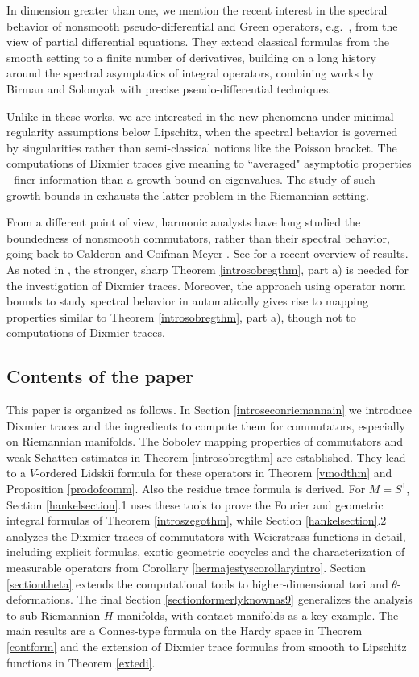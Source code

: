 \documentclass[10pt]{amsart}
\theoremstyle{remark}
\theoremstyle{definition}
\begin{document}
In dimension greater than one, we mention the recent interest in the spectral behavior of nonsmooth pseudo-differential and Green operators, e.g.~\cite{grubb}, from the view of partial differential equations. They extend classical formulas from the smooth setting to a finite number of derivatives, building on a long history around the spectral asymptotics of integral operators, combining works by Birman and Solomyak \cite{birsol, birsolinterpolation} with precise pseudo-differential techniques. 

Unlike in these works, we are interested in the new phenomena under minimal regularity assumptions below Lipschitz, when the spectral behavior is governed by singularities rather than semi-classical notions like the Poisson bracket. The computations of Dixmier traces give meaning to ``averaged" asymptotic properties - finer information than a growth bound on eigenvalues. The study of such growth bounds in \cite{rochbergsemmes} exhausts the latter problem in the Riemannian setting.

From a different point of view, harmonic analysts have long studied the boundedness of nonsmooth commutators, rather than their spectral behavior, going back to Calderon \cite{calderonone} and Coifman-Meyer \cite{ceemtwo}. See \cite[Chapter 3.6]{nlin} for a recent overview of  results. As noted in \cite{gimpgoff}, the stronger, sharp Theorem \ref{introsobregthm}, part a) is needed for the investigation of Dixmier traces. Moreover, the approach using operator norm bounds to study spectral behavior in \cite{gimpgoff} automatically gives rise to mapping properties similar to Theorem \ref{introsobregthm}, part a), though not to computations of Dixmier traces. 

\subsection*{Contents of the paper}

This paper is organized as follows. In Section \ref{introseconriemannain} we introduce Dixmier traces and the ingredients to compute them for commutators, especially on Riemannian manifolds. The Sobolev mapping properties of commutators and weak Schatten estimates in Theorem \ref{introsobregthm} are established. They lead to a $V$-ordered Lidskii formula for these operators in Theorem \ref{vmodthm} and Proposition \ref{prodofcomm}. Also the residue trace formula is derived. For $M=S^1$, Section \ref{hankelsection}.1 uses these tools to prove the Fourier and geometric integral formulas  of Theorem \ref{introszegothm}, while Section \ref{hankelsection}.2 analyzes the Dixmier traces of commutators with Weierstrass functions in detail, including explicit formulas, exotic geometric cocycles and the characterization of measurable operators from Corollary \ref{hermajestyscorollaryintro}. Section \ref{sectiontheta} extends the computational tools to higher-dimensional tori and $\theta$-deformations. The final Section \ref{sectionformerlyknownas9} generalizes the analysis to sub-Riemannian $H$-manifolds, with contact manifolds as a key example. The main results are a Connes-type formula on the Hardy space in Theorem \ref{contform} and the extension of Dixmier trace formulas from smooth to Lipschitz functions in Theorem \ref{extedi}.
\end{document}
